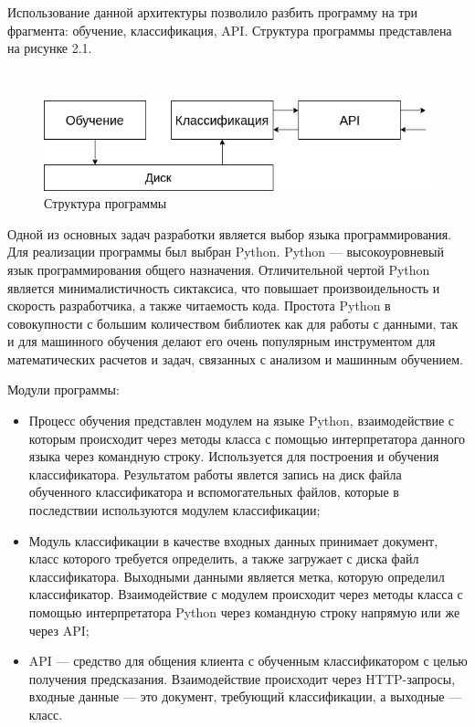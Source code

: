 Использование данной архитектуры позволило разбить программу на три фрагмента: обучение, классификация, API. Структура программы представлена на рисунке 2.1.

\


  \begin{figure}[h!]
    \centering
    \setlength{\fboxsep}{5pt}
    \includegraphics[width=.9\textwidth]{img/module-structure}
    \vspace*{6pt}
    \caption{Структура программы}\label{fig:project-tree}
  \end{figure}


Одной из основных задач разработки является выбор языка программирования. Для реализации программы был выбран Python. Python — высокоуровневый язык программирования общего назначения. Отличительной чертой Python является минималистичность сиктаксиса, что повышает произвоидельность и скорость разработчика, а также читаемость кода.\cite{Python} Простота Python в совокупности с большим количеством библиотек как для работы с данными, так и для машинного обучения делают его очень популярным инструментом для математических расчетов и задач, связанных с анализом и машинным обучением.

Модули программы:

\begin{itemize}
  \item Процесс обучения представлен модулем на языке Python, взаимодействие с которым происходит через методы класса с помощью интерпретатора данного языка через командную строку. Используется для построения и обучения классификатора. Результатом работы явлется запись на диск файла обученного классификатора и вспомогательных файлов, которые в последствии используются модулем классификации;
  \item Модуль классификации в качестве входных данных принимает документ, класс которого требуется определить, а также загружает с диска файл классификатора. Выходными данными является метка, которую определил классификатор. Взаимодействие с модулем происходит через методы класса с помощью интерпретатора Python через командную строку напрямую или же через API;
  \item API — средство для общения клиента с обученным классификатором с целью получения предсказания. Взаимодействие происходит через HTTP-запросы, входные данные — это документ, требующий классификации, а выходные — класс.
\end{itemize}

